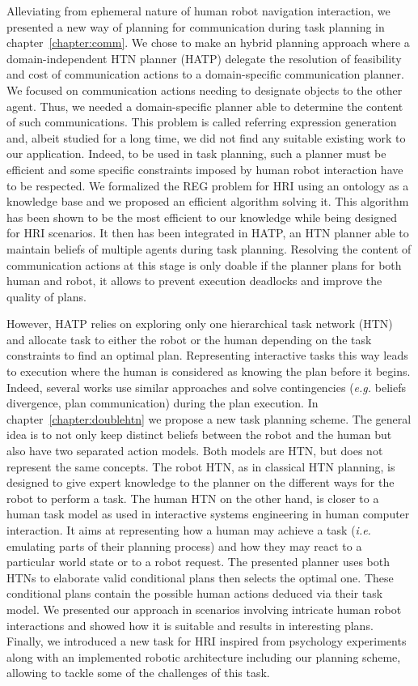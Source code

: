 \documentclass[a4paper,11pt,twoside]{StyleThese}
\begin{document}
Alleviating from ephemeral nature of human robot navigation interaction, we presented a new way of planning for communication during task planning in chapter~\ref{chapter:comm}. We chose to make an hybrid planning approach where a domain-independent HTN planner (HATP) delegate the resolution of feasibility and cost of communication actions to a domain-specific communication planner. We focused on communication actions needing to designate objects to the other agent. Thus, we needed a domain-specific planner able to determine the content of such communications. This problem is called referring expression generation and, albeit studied for a long time, we did not find any suitable existing work to our application. Indeed, to be used in task planning, such a planner must be efficient and some specific constraints imposed by human robot interaction have to be respected. We formalized the REG problem for HRI using an ontology as a knowledge base and we proposed an efficient algorithm solving it. This algorithm has been shown to be the most efficient to our knowledge while being designed for HRI scenarios. It then has been integrated in HATP, an HTN planner able to maintain beliefs of multiple agents during task planning. Resolving the content of communication actions at this stage is only doable if the planner plans for both human and robot, it allows to prevent execution deadlocks and improve the quality of plans.

However, HATP relies on exploring only one hierarchical task network (HTN) and allocate task to either the robot or the human depending on the task constraints to find an optimal plan. Representing interactive tasks this way leads to execution where the human is considered as knowing the plan before it begins. Indeed, several works use similar approaches and solve contingencies (\textit{e.g.} beliefs divergence, plan communication) during the plan execution. In chapter~\ref{chapter:doublehtn} we propose a new task planning scheme. The general idea is to not only keep distinct beliefs between the robot and the human but also have two separated action models. Both models are HTN, but does not represent the same concepts. The robot HTN, as in classical HTN planning, is designed to give expert knowledge to the planner on the different ways for the robot to perform a task. The human HTN on the other hand, is closer to a human task model as used in interactive systems engineering in human computer interaction. It aims at representing how a human may achieve a task (\textit{i.e.} emulating parts of their planning process) and how they may react to a particular world state or to a robot request. The presented planner uses both HTNs to elaborate valid conditional plans then selects the optimal one. These conditional plans contain the possible human actions deduced via their task model. We presented our approach in scenarios involving intricate human robot interactions and showed how it is suitable and results in interesting plans. Finally, we introduced a new task for HRI inspired from psychology experiments along with an implemented robotic architecture including our planning scheme, allowing to tackle some of the challenges of this task.
\end{document}
